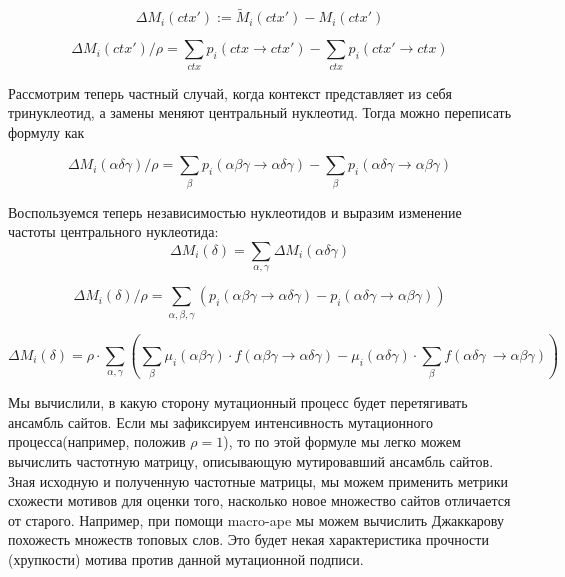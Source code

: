 \documentclass[a4paper]{article}
\begin{document}
\begin{equation}
\Delta M_i(ctx') := \widetilde{M}_i(ctx') - M_i(ctx')
\end{equation}

\begin{equation}
\boxed{ \Delta M_i(ctx') / \rho = \sum_{ctx} p_i(ctx \to ctx') - \sum_{ctx} p_i(ctx' \to ctx) }
\end{equation}

Рассмотрим теперь частный случай, когда контекст представляет из себя тринуклеотид, а замены меняют центральный нуклеотид. Тогда можно переписать формулу как

\begin{equation}
\Delta M_i(\alpha\delta\gamma) / \rho = \sum_{\beta} p_i(\alpha\beta\gamma \to \alpha\delta\gamma) - \sum_{\beta} p_i(\alpha\delta\gamma \to \alpha\beta\gamma)
\end{equation}

Воспользуемся теперь независимостью нуклеотидов и выразим изменение частоты центрального нуклеотида:
\begin{equation}
\Delta M_i(\delta) = \sum_{\alpha, \gamma}\Delta M_i(\alpha\delta\gamma)
\end{equation}

\begin{equation}
\Delta M_i(\delta) / \rho = \sum_{\alpha,\beta,\gamma}\left(p_i(\alpha\beta\gamma \to \alpha\delta\gamma) - p_i(\alpha\delta\gamma \to \alpha\beta\gamma)\right)
\end{equation}


\begin{equation}
\boxed{
\Delta M_i(\delta) = \rho\cdot\sum_{\alpha,\gamma}\left(\sum_{\beta}\mu_i(\alpha\beta\gamma)\cdot f(\alpha\beta\gamma \to \alpha\delta\gamma) - \mu_i(\alpha\delta\gamma)\cdot\sum_{\beta}f(\alpha\delta\gamma\ \to \alpha\beta\gamma)\right)
}
\end{equation}

Мы вычислили, в какую сторону мутационный процесс будет перетягивать ансамбль сайтов.
Если мы зафиксируем интенсивность мутационного процесса(например, положив $\rho=1$), то по этой формуле мы легко можем вычислить частотную матрицу, описывающую мутировавший ансамбль сайтов. Зная исходную и полученную частотные матрицы, мы можем применить метрики схожести мотивов для оценки того, насколько новое множество сайтов отличается от старого. Например, при помощи macro-ape мы можем вычислить Джаккарову похожесть множеств топовых слов. Это будет некая характеристика прочности (хрупкости) мотива против данной мутационной подписи.
\end{document}
